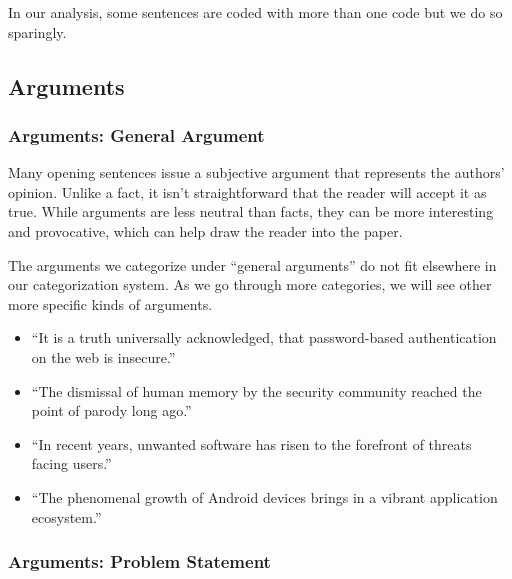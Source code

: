 \documentclass[sigconf]{acmart}
\begin{document}
	In our analysis, some sentences are coded with more than one code but we do so sparingly.


	\subsection{Arguments}
	\subsubsection{Arguments: General Argument}

	Many opening sentences issue a subjective argument that represents the authors’ opinion. Unlike a fact, it isn’t straightforward that the reader will accept it as true. While arguments are less neutral than facts, they can be more interesting and provocative, which can help draw the reader into the paper.

	The arguments we categorize under “general arguments” do not fit elsewhere in our categorization system. As we go through more categories, we will see other more specific kinds of arguments.
	\begin{itemize}
		\item ``It is a truth universally acknowledged, that password-based authentication on the web is insecure.''~\cite{li2014emperor}

		\item 	``The dismissal of human memory by the security community reached the point of parody long ago.''~\cite{bonneau2014towards}

		\item ``In recent years, unwanted software has risen to the forefront of threats facing users.''~\cite{thomas2016investigating}

		\item 		``The phenomenal growth of Android devices brings in a vibrant application ecosystem.''~\cite{chen2015finding}
	\end{itemize}


	\subsubsection{Arguments: Problem Statement }
\end{document}
